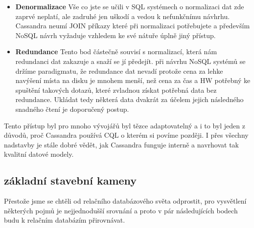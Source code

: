 \begin{itemize}
\item \textbf{Denormalizace} Vše co jste se učili v SQL systémech o normalizaci dat zde zaprvé neplatí, ale zadruhé jen uškodí a vedou k nefunkčnímu návhrhu. Cassandra neumí JOIN příkazy které při normalizaci potřebujete a především NoSQL návrh vyžaduje vzhledem ke své nátuře úplně jiný přístup. 
\item \textbf{Redundance} Tento bod částečně souvisí s normalizací, která nám redundanci dat zakazuje a snaží se jí předejít. při návrhu NoSQL systémů se držíme paradigmatu, že redundance dat nevadí protože cena za lehke navýšení místa na disku je mnohem menší, než cena za čas a HW potřebný ke spuštění takových dotazů, které zvladnou získat potřebná data bez redundance. Ukládat tedy některá data dvakrát za účelem jejich následného snadného čtení je doporučený postup. 
\end{itemize}

Tento přístup byl pro mnoho vývojářů byl tězce adaptovatelný a i to byl jeden z důvodů, proč Cassandra používá CQL o kterém si povíme později. I přes všechny nadstavby je stále dobré vědět, jak Cassandra funguje interně a navrhovat tak kvalitní datové modely. 

\subsection{základní stavební kameny}
Přestože jsme se chtěli od relačního databázového světa odprostit, pro vysvětlení některých pojmů je nejjednodušší srovnání a proto v pár následujících bodech budu k relačním databázím přirovnávat.

